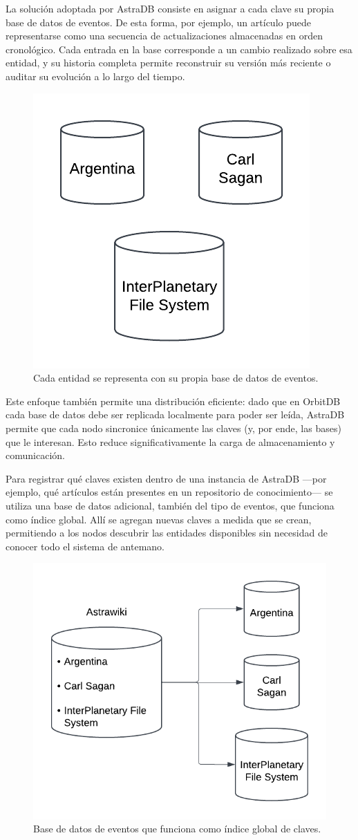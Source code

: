 La solución adoptada por AstraDB consiste en asignar a cada clave su propia base de datos de eventos. De esta forma, por ejemplo, un artículo puede representarse como una secuencia de actualizaciones almacenadas en orden cronológico. Cada entrada en la base corresponde a un cambio realizado sobre esa entidad, y su historia completa permite reconstruir su versión más reciente o auditar su evolución a lo largo del tiempo.

\begin{figure}[H]
\centering
\includegraphics[width=0.4\linewidth]{img/solucion-ipfs/bdd-articulos.png}
\caption{Cada entidad se representa con su propia base de datos de eventos.}
\label{fig:bdd-articulos}
\end{figure}

Este enfoque también permite una distribución eficiente: dado que en OrbitDB cada base de datos debe ser replicada localmente para poder ser leída, AstraDB permite que cada nodo sincronice únicamente las claves (y, por ende, las bases) que le interesan. Esto reduce significativamente la carga de almacenamiento y comunicación.

Para registrar qué claves existen dentro de una instancia de AstraDB —por ejemplo, qué artículos están presentes en un repositorio de conocimiento— se utiliza una base de datos adicional, también del tipo de eventos, que funciona como índice global. Allí se agregan nuevas claves a medida que se crean, permitiendo a los nodos descubrir las entidades disponibles sin necesidad de conocer todo el sistema de antemano.

\begin{figure}[H]
\centering
\includegraphics[width=0.6\linewidth]{img/solucion-ipfs/bdd-wiki.png}
\caption{Base de datos de eventos que funciona como índice global de claves.}
\label{fig:bdd-wiki}
\end{figure}


